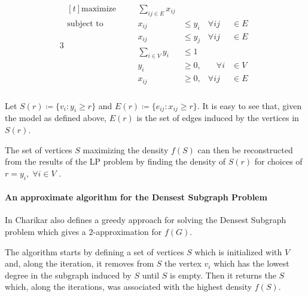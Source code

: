 \begin{alignat}{3}
	\label{eq:standard-form}
	\begin{aligned}[t]
		\text{maximize}   &       & \sum_{ij \in E} x_{ij}                 \\
		\text{subject to} & \quad & x_{ij}                  & \leq y_{i} &
		\forall ij        & \in E                                          \\
		                  &       & x_{ij}                  & \leq y_{j} &
		\forall ij        & \in E                                          \\
		                  &       & \sum^{}_{i \in V} y_{i} & \leq 1     & \\
		                  &       & y_{i}                   & \geq 0,    &
		\quad \forall i   & \in V                                          \\
		                  &       & x_{ij}                  & \geq 0,    &
		\forall ij        & \in E                                          \\
	\end{aligned}
\end{alignat}

Let $S(r) \coloneqq \{v_{i} : y_{i} \geq r\} $ and $E(r) \coloneqq \{e_{ij} :
	x_{ij} \geq r\} $. It is easy to see that, given the model as defined
above, $E(r)$ is the set of edges induced by the vertices in $S(r)$.

The set of vertices $S$ maximizing the density $f(S)$ can then be reconstructed
from the results of the \acrshort{LP} problem by finding the density of $S(r)$
for choices of $r = y_{i}, \; \forall i \in V $ \cite{charikar2000greedy}.

\paragraph{An approximate algorithm for the Densest Subgraph Problem}%
\label{par:an_approximate_algorithm_for_the_densest_subgraph_problem}

In \cite{charikar2000greedy} Charikar also defines a greedy approach for
solving the Densest Subgraph problem which gives a $2$-approximation for
$f(G)$.

The algorithm starts by defining a set of vertices $S$ which is initialized
with $V$ and, along the iteration, it removes from $S$ the vertex $v_i$ which
has the lowest degree in the subgraph induced by $S$ until $S$ is empty. Then
it returns the $S$ which, along the iterations, was associated with the highest
density $f(S)$.


